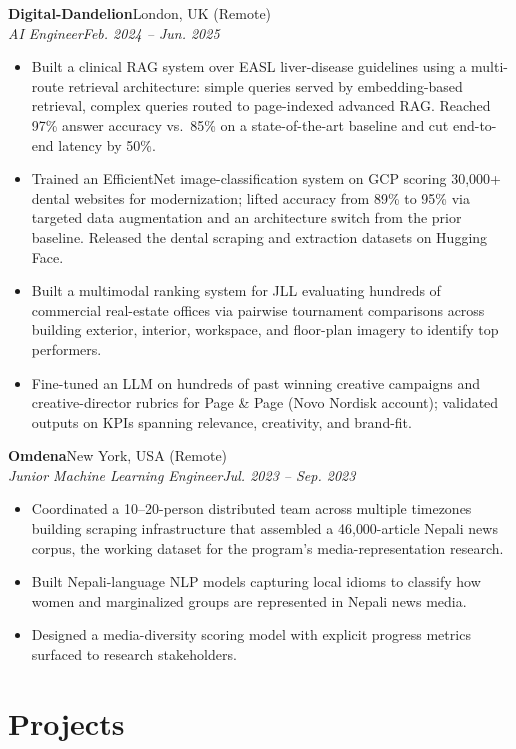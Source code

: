 \documentclass[11pt,a4paper]{article}
\newcommand{\role}[4]{%
  \noindent\textbf{#1}\hfill #2\\[1pt]
  \textit{#3}\hfill \textit{#4}\par
  \vspace{2pt}
}
\newenvironment{bullets}{%
  \vspace{-2pt}
  \begin{itemize}[leftmargin=14pt, itemsep=1pt, topsep=2pt, label={\textbullet}]
}{\end{itemize}\vspace{3pt}}
\begin{document}
\role{Digital-Dandelion}{London, UK (Remote)}{AI Engineer}{Feb. 2024 -- Jun. 2025}
\begin{bullets}
  \item Built a clinical RAG system over EASL liver-disease guidelines using a multi-route retrieval architecture: simple queries served by embedding-based retrieval, complex queries routed to page-indexed advanced RAG. Reached 97\% answer accuracy vs.\ 85\% on a state-of-the-art baseline and cut end-to-end latency by 50\%.
  \item Trained an EfficientNet image-classification system on GCP scoring 30{,}000+ dental websites for modernization; lifted accuracy from 89\% to 95\% via targeted data augmentation and an architecture switch from the prior baseline. Released the dental scraping and extraction datasets on Hugging Face.
  \item Built a multimodal ranking system for JLL evaluating hundreds of commercial real-estate offices via pairwise tournament comparisons across building exterior, interior, workspace, and floor-plan imagery to identify top performers.
  \item Fine-tuned an LLM on hundreds of past winning creative campaigns and creative-director rubrics for Page \& Page (Novo Nordisk account); validated outputs on KPIs spanning relevance, creativity, and brand-fit.
\end{bullets}

\role{Omdena}{New York, USA (Remote)}{Junior Machine Learning Engineer}{Jul. 2023 -- Sep. 2023}
\begin{bullets}
  \item Coordinated a 10--20-person distributed team across multiple timezones building scraping infrastructure that assembled a 46{,}000-article Nepali news corpus, the working dataset for the program's media-representation research.
  \item Built Nepali-language NLP models capturing local idioms to classify how women and marginalized groups are represented in Nepali news media.
  \item Designed a media-diversity scoring model with explicit progress metrics surfaced to research stakeholders.
\end{bullets}

\section*{Projects}
\end{document}
